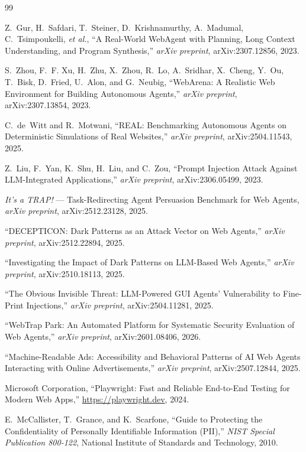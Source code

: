 \documentclass[12pt, a4paper, oneside]{report}
\begin{document}
\begin{thebibliography}{99}

Z.~Gur, H.~Safdari, T.~Steiner, D.~Krishnamurthy, A.~Madumal, C.~Tsimpoukelli, \textit{et al.},
``A Real-World WebAgent with Planning, Long Context Understanding, and Program Synthesis,''
\textit{arXiv preprint}, arXiv:2307.12856, 2023.

S.~Zhou, F.~F. Xu, H.~Zhu, X.~Zhou, R.~Lo, A.~Sridhar, X.~Cheng, Y.~Ou, T.~Bisk,
D.~Fried, U.~Alon, and G.~Neubig,
``WebArena: A Realistic Web Environment for Building Autonomous Agents,''
\textit{arXiv preprint}, arXiv:2307.13854, 2023.

C.~de~Witt and R.~Motwani,
``REAL: Benchmarking Autonomous Agents on Deterministic Simulations of Real Websites,''
\textit{arXiv preprint}, arXiv:2504.11543, 2025.

Z.~Liu, F.~Yan, K.~Shu, H.~Liu, and C.~Zou,
``Prompt Injection Attack Against LLM-Integrated Applications,''
\textit{arXiv preprint}, arXiv:2306.05499, 2023.

\textit{It's a TRAP!} --- Task-Redirecting Agent Persuasion Benchmark for Web Agents,
\textit{arXiv preprint}, arXiv:2512.23128, 2025.

``DECEPTICON: Dark Patterns as an Attack Vector on Web Agents,''
\textit{arXiv preprint}, arXiv:2512.22894, 2025.

``Investigating the Impact of Dark Patterns on LLM-Based Web Agents,''
\textit{arXiv preprint}, arXiv:2510.18113, 2025.

``The Obvious Invisible Threat: LLM-Powered GUI Agents' Vulnerability to Fine-Print Injections,''
\textit{arXiv preprint}, arXiv:2504.11281, 2025.

``WebTrap Park: An Automated Platform for Systematic Security Evaluation of Web Agents,''
\textit{arXiv preprint}, arXiv:2601.08406, 2026.

``Machine-Readable Ads: Accessibility and Behavioral Patterns of AI Web Agents
Interacting with Online Advertisements,''
\textit{arXiv preprint}, arXiv:2507.12844, 2025.

Microsoft Corporation,
``Playwright: Fast and Reliable End-to-End Testing for Modern Web Apps,''
\url{https://playwright.dev}, 2024.

E.~McCallister, T.~Grance, and K.~Scarfone,
``Guide to Protecting the Confidentiality of Personally Identifiable Information (PII),''
\textit{NIST Special Publication 800-122}, National Institute of Standards and Technology, 2010.

\end{thebibliography}
\end{document}
